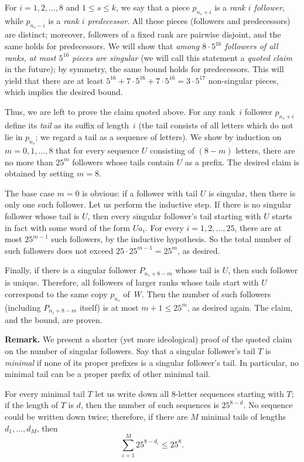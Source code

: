 \documentclass[12pt]{article}
\begin{document}
For $i=1,2,\dots,8$ and  $1\leq s\leq k$, we say that a piece $p_{n_s+i}$ is a \emph{rank $i$ follower}, while $p_{n_s-i}$ is a \emph{rank $i$ predecessor}. All these pieces (followers and predecessors) are distinct; moreover, followers of a fixed rank are pairwise disjoint, and the same holds for predecessors. We will show that \textit{among $8\cdot 5^{16}$ followers of all ranks, at most $5^{16}$ pieces are singular} (we will call this statement a \textit{quoted claim} in the future); by symmetry, the same bound holds for predecessors. This will yield that there are at least $5^{16}+7\cdot 5^{16}+7\cdot 5^{16}=3\cdot 5^{17}$ non-singular pieces, which implies the desired bound.

\smallskip
Thus, we are left to prove the claim quoted above. For any rank~$i$ follower $p_{n_s+i}$ define its \emph{tail}
as its suffix of length~$i$ (the tail consists of all letters which do not lie in $p_{n_s}$; we regard a tail as a sequence of letters). We show by induction on $m=0,1,\dots,8$ that for every sequence $U$ consisting of $(8-m)$ letters, there are no more than $25^m$ followers whose tails contain $U$ as a prefix. The desired claim is obtained by setting $m=8$.

The base case $m=0$ is obvious: if a follower with tail $U$ is singular, then there is only one such follower. Let us perform the inductive step. If there is no singular follower whose tail is $U$, then every singular follower's tail starting with $U$ starts in fact with some word of the form $Ua_i$. For every $i=1,2,\dots,25$, there are at most $25^{m-1}$ such followers, by the inductive hypothesis. So the total number of such followers does not exceed  $25\cdot 25^{m-1}=25^m$, as desired.

Finally, if there is a singular follower $P_{n_s+8-m}$ whose tail is $U$, then such follower is unique. Therefore, all followers of larger ranks whose tails start with $U$ correspond to the same copy $p_{n_s}$ of~$W$. Then the number of such followers (including $P_{n_s+8-m}$ itself) is at most $m+1\leq 25^m$, as desired again. The claim, and the bound, are proven.

\medskip
\textbf{Remark.} We present a shorter (yet more ideological) proof of the quoted claim on the number of singular followers. Say that a singular follower's tail $T$ is \emph{minimal} if none of its proper prefixes is a singular follower's tail. In particular, no minimal tail can be a proper prefix of other minimal tail.

For every minimal tail $T$ let us write down all $8$-letter sequences starting with $T$; if the length of $T$ is $d$, then the number of such sequences is $25^{8-d}$. No sequence could be written down twice; therefore, if there are $M$ minimal tails of lengths $d_1,\dots,d_M$, then
$$
  \sum_{i=1}^M 25^{8-d_i}\leq 25^8.
$$
\end{document}
